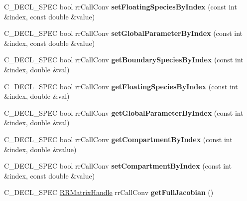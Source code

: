 \begin{DoxyCompactItemize}
\item 
\hypertarget{group__loadsave_gaf4a5a4d9b1ecf60d4b98189b4bcf2543}{
\-C\-\_\-\-D\-E\-C\-L\-\_\-\-S\-P\-E\-C bool rr\-Call\-Conv {\bfseries set\-Floating\-Species\-By\-Index} (const int \&index, const double \&value)}
\label{group__loadsave_gaf4a5a4d9b1ecf60d4b98189b4bcf2543}

\item 
\hypertarget{group__loadsave_ga65d9546856e5526fc403539903039f8e}{
\-C\-\_\-\-D\-E\-C\-L\-\_\-\-S\-P\-E\-C bool rr\-Call\-Conv {\bfseries set\-Global\-Parameter\-By\-Index} (const int \&index, const double \&value)}
\label{group__loadsave_ga65d9546856e5526fc403539903039f8e}

\item 
\hypertarget{group__loadsave_gaccee3467307dbcedd031c1dc2cf57606}{
\-C\-\_\-\-D\-E\-C\-L\-\_\-\-S\-P\-E\-C bool rr\-Call\-Conv {\bfseries get\-Boundary\-Species\-By\-Index} (const int \&index, double \&val)}
\label{group__loadsave_gaccee3467307dbcedd031c1dc2cf57606}

\item 
\hypertarget{group__loadsave_gab73fad6a1dfdb2b2d393964354d94c69}{
\-C\-\_\-\-D\-E\-C\-L\-\_\-\-S\-P\-E\-C bool rr\-Call\-Conv {\bfseries get\-Floating\-Species\-By\-Index} (const int \&index, double \&val)}
\label{group__loadsave_gab73fad6a1dfdb2b2d393964354d94c69}

\item 
\hypertarget{group__loadsave_ga1aae76d21a054da6ed6cc734ad10287a}{
\-C\-\_\-\-D\-E\-C\-L\-\_\-\-S\-P\-E\-C bool rr\-Call\-Conv {\bfseries get\-Global\-Parameter\-By\-Index} (const int \&index, double \&val)}
\label{group__loadsave_ga1aae76d21a054da6ed6cc734ad10287a}

\item 
\hypertarget{group__loadsave_ga5241b915cff8bcabba3024c33fb4e336}{
\-C\-\_\-\-D\-E\-C\-L\-\_\-\-S\-P\-E\-C bool rr\-Call\-Conv {\bfseries get\-Compartment\-By\-Index} (const int \&index, double \&value)}
\label{group__loadsave_ga5241b915cff8bcabba3024c33fb4e336}

\item 
\hypertarget{group__loadsave_gadb238a943d93bc9548bf5c3cd452e9bb}{
\-C\-\_\-\-D\-E\-C\-L\-\_\-\-S\-P\-E\-C bool rr\-Call\-Conv {\bfseries set\-Compartment\-By\-Index} (const int \&index, const double \&value)}
\label{group__loadsave_gadb238a943d93bc9548bf5c3cd452e9bb}

\item 
\hypertarget{group__loadsave_ga228e8431e466bf7e5987c1179dcbbbd8}{
\-C\-\_\-\-D\-E\-C\-L\-\_\-\-S\-P\-E\-C \hyperlink{struct_r_r_matrix}{\-R\-R\-Matrix\-Handle} \*
rr\-Call\-Conv {\bfseries get\-Full\-Jacobian} ()}
\label{group__loadsave_ga228e8431e466bf7e5987c1179dcbbbd8}


\end{DoxyCompactItemize}
